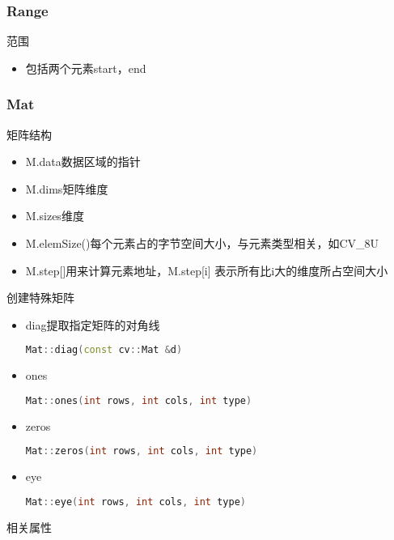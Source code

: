 \documentclass[12pt]{article}
\begin{document}
\subsubsection{Range}
范围
\begin{itemize}
\item 包括两个元素start，end
\end{itemize}

\subsubsection{Mat}
矩阵结构
\begin{itemize}
\item M.data数据区域的指针
\item M.dims矩阵维度
\item M.sizes维度
\item M.elemSize()每个元素占的字节空间大小，与元素类型相关，如CV\_8U
\item M.step[]用来计算元素地址，M.step[i] 表示所有比i大的维度所占空间大小
\end{itemize}
创建特殊矩阵
\begin{itemize}
\item diag提取指定矩阵的对角线
	\begin{lstlisting}[language=c++]
	Mat::diag(const cv::Mat &d)
	\end{lstlisting}
\item ones
	\begin{lstlisting}[language=C++]
	Mat::ones(int rows, int cols, int type)
	\end{lstlisting}
\item zeros 
	\begin{lstlisting}[language=C++]
	Mat::zeros(int rows, int cols, int type)
	\end{lstlisting}
\item eye 
	\begin{lstlisting}[language=C++]
	Mat::eye(int rows, int cols, int type)
	\end{lstlisting}
\end{itemize}
相关属性
\end{document}
